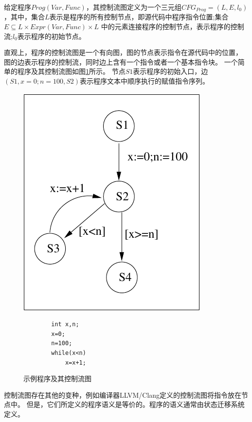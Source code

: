 \begin{definition}
给定程序$Prog(Var, Func)$，其控制流图定义为一个三元组$CFG_{Prog} = (L, E, l_0)$，其中，集合$L$表示是程序的所有控制节点，即源代码中程序指令位置;集合$E\subseteq L\times Expr(Var, Func) \times L$
	中的元素连接程序的控制节点，表示程序的控制流;$l_0$表示程序的初始节点。
\end{definition}


直观上，程序的控制流图是一个有向图，图的节点表示指令在源代码中的位置，
图的边表示程序的控制流，同时边上含有一个指令或者一个基本指令块。
一个简单的程序及其控制流图如图\ref{fig-example}所示。
节点$S1$表示程序的初始入口，边$(S1, x=0;n=100, S2)$表示程序文本中顺序执行的赋值指令序列。

\begin{figure}[h]
	\begin{minipage}{.5\textwidth}
		\centering
		\includegraphics{figures/chap02/example1.pdf}
	\end{minipage}
	\begin{minipage}{.5\textwidth}
		\centering
		\begin{lstlisting}
		int x,n;
		x=0;
		n=100;
		while(x<n)
			x=x+1;
		\end{lstlisting}
	\end{minipage}
	\caption{示例程序及其控制流图}
	\label{fig-example}
\end{figure}


控制流图存在其他的变种，例如编译器LLVM/Clang定义的控制流图将指令放在节点中。
但是，它们所定义的程序语义是等价的。程序的语义通常由状态迁移系统定义。

